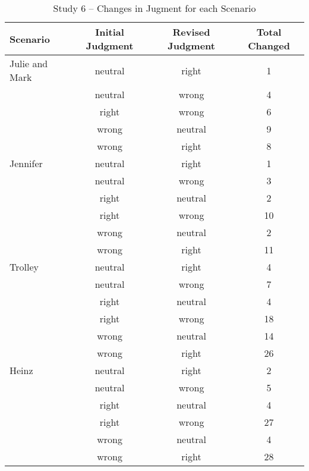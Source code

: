 \documentclass[
  american,
  man,floatsintext]{apa7}
\begin{document}
\begin{table}[tbp]

\begin{center}
\begin{threeparttable}

\caption{\label{tab:tabS6changeeachscenario}Study 6 – Changes in Jugment for each Scenario}

\begin{tabular}{lccc}
\toprule
Scenario & \multicolumn{1}{c}{Initial Judgment} & \multicolumn{1}{c}{Revised Judgment} & \multicolumn{1}{c}{Total Changed}\\
\midrule
Julie and Mark & neutral & right & 1\\
 & neutral & wrong & 4\\
 & right & wrong & 6\\
 & wrong & neutral & 9\\
 & wrong & right & 8\\
Jennifer & neutral & right & 1\\
 & neutral & wrong & 3\\
 & right & neutral & 2\\
 & right & wrong & 10\\
 & wrong & neutral & 2\\
 & wrong & right & 11\\
Trolley & neutral & right & 4\\
 & neutral & wrong & 7\\
 & right & neutral & 4\\
 & right & wrong & 18\\
 & wrong & neutral & 14\\
 & wrong & right & 26\\
Heinz & neutral & right & 2\\
 & neutral & wrong & 5\\
 & right & neutral & 4\\
 & right & wrong & 27\\
 & wrong & neutral & 4\\
 & wrong & right & 28\\
\bottomrule
\end{tabular}

\end{threeparttable}
\end{center}

\end{table}
\end{document}
